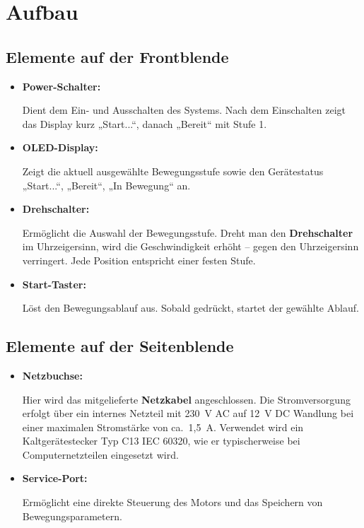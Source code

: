 \documentclass[a4paper,12pt]{report}
\begin{document}
	\section {Aufbau}
	\subsection {Elemente auf der Frontblende }
	\begin{itemize}[leftmargin=1.5em]
		
		\item \textbf{Power-Schalter:}
		
		Dient dem Ein- und Ausschalten des Systems. Nach dem Einschalten zeigt das Display kurz „Start...“, danach „Bereit“ mit Stufe 1. \\
		
		\item \textbf{OLED-Display:} 
		
		Zeigt die aktuell ausgewählte Bewegungsstufe sowie den Gerätestatus „Start...“, „Bereit“, „In Bewegung“ an.\\
		
		\item \textbf{Drehschalter:} 
		
		Ermöglicht die Auswahl der Bewegungsstufe. Dreht man den \textbf{Drehschalter} im Uhrzeigersinn, wird die Geschwindigkeit erhöht – gegen den Uhrzeigersinn verringert. Jede Position entspricht einer festen Stufe.\\
		
		\item \textbf{Start-Taster:}
		
		Löst den Bewegungsablauf aus. Sobald gedrückt, startet der gewählte Ablauf.\\ 
		
	\end{itemize}
	\newpage
	
	\subsection{Elemente auf der Seitenblende}
	\begin{itemize}[leftmargin=1.5em]
		
		\item \textbf{Netzbuchse:}
		
		Hier wird das mitgelieferte \textbf{Netzkabel} angeschlossen. Die Stromversorgung erfolgt über ein internes Netzteil mit 230~V AC auf 12~V DC Wandlung bei einer maximalen Stromstärke von ca.\ 1{,}5~A. Verwendet wird ein Kaltgerätestecker Typ C13 IEC 60320, wie er typischerweise bei Computernetzteilen eingesetzt wird.

		
		\item \textbf{Service-Port:}
		
		Ermöglicht eine direkte Steuerung des Motors und das Speichern von Bewegungsparametern.\\
		
	\end{itemize}
	
\end{document}
